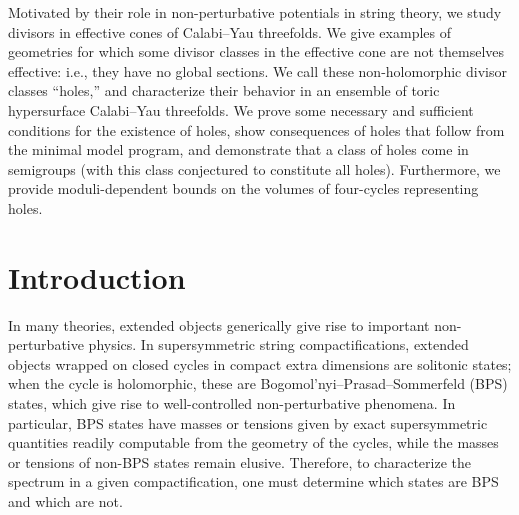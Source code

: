 \documentclass[11pt,dvipsnames]{article}
\theoremstyle{definition}
\begin{document}
\begin{center}
	\begin{minipage}[h]{15.0cm}

Motivated by their role in non-perturbative potentials in string theory, we study divisors in effective cones of Calabi--Yau threefolds. We give examples of geometries for which some divisor classes in the effective cone are not themselves effective: i.e., they have no global sections. We call these non-holomorphic divisor classes ``holes,'' and characterize their behavior in an ensemble of toric hypersurface Calabi--Yau threefolds. We prove some necessary and sufficient conditions for the existence of holes, show consequences of holes that follow from the minimal model program, and demonstrate that a class of holes come in semigroups (with this class conjectured to constitute all holes). Furthermore, we provide moduli-dependent bounds on the volumes of four-cycles representing holes.

 

\end{minipage}
\end{center}
	\newpage
	\setcounter{page}{1}
	\pagestyle{plain}
	\setcounter{footnote}{0}
\tableofcontents
        \newpage
\section{Introduction}

In many theories, extended objects generically give rise to important non-perturbative physics. In supersymmetric string compactifications, extended objects wrapped on closed cycles in compact extra dimensions are solitonic states; when the cycle is holomorphic, these are Bogomol'nyi–Prasad–Sommerfeld (BPS) states, which give rise to well-controlled non-perturbative phenomena. In particular, BPS states have masses or tensions given by exact supersymmetric quantities readily computable from the geometry of the cycles, while the masses or tensions of non-BPS states remain elusive. Therefore, to characterize the spectrum in a given compactification, one must determine which states are BPS and which are not.
\end{document}
